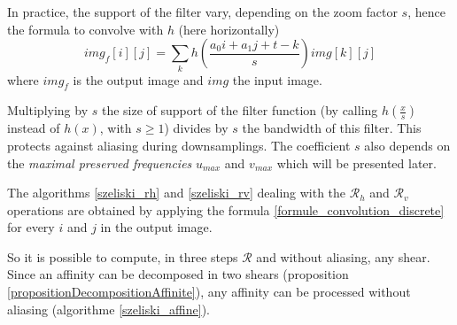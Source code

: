 	In practice, the support of the filter vary, depending on the zoom factor $s$, hence the formula to convolve with $h$ (here horizontally)
	\begin{equation}
	img_f[i][j] = \displaystyle{\sum_k}h\left(\frac{a_0i+a_1j+t-k}{s}\right)img[k][j]
	\label{formule_convolution_discrete}
	\end{equation}
	where $img_f$ is the output image and $img$ the input image.
	
	
	
	Multiplying by $s$ the size of support of the filter function (by calling $h(\frac{x}{s})$ instead of $h(x)$, with $s\geq 1$) divides by $s$ the bandwidth of this filter. This protects against aliasing during downsamplings. The coefficient $s$ also depends on the \emph{maximal preserved frequencies} $u_{max}$ and $v_{max}$ which will be presented later.
	
	
	The algorithms \ref{szeliski_rh} and \ref{szeliski_rv} dealing with the $\mathcal R_h$ and $\mathcal R_v$ operations are obtained by applying the formula \ref{formule_convolution_discrete} for every $i$ and $j$ in the output image. \label{szeliski_rv_rh_section}
	
	
	So it is possible to compute, in three steps $\mathcal R$ and without aliasing, any shear. Since an affinity can be decomposed in two shears (proposition \ref{propositionDecompositionAffinite}), any affinity can be processed without aliasing (algorithme \ref{szeliski_affine}).
	

